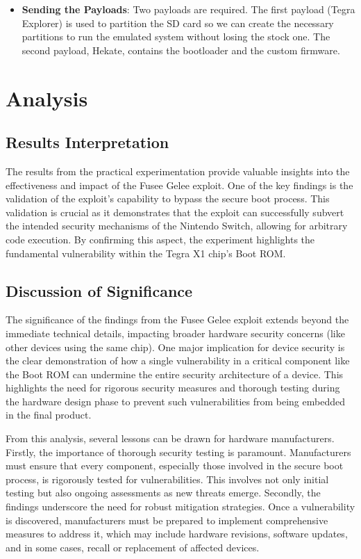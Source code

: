 \begin{itemize}
    \item \textbf{Sending the Payloads}: Two payloads are required. The first payload (Tegra Explorer) is used to partition the SD card so we can create the necessary partitions to run the emulated system without losing the stock one. The second payload, Hekate, contains the bootloader and the custom firmware.
\end{itemize}

\section{Analysis}

\subsection{Results Interpretation}

The results from the practical experimentation provide valuable insights into the effectiveness and impact of the Fusee Gelee exploit. One of the key findings is the validation of the exploit's capability to bypass the secure boot process. This validation is crucial as it demonstrates that the exploit can successfully subvert the intended security mechanisms of the Nintendo Switch, allowing for arbitrary code execution. By confirming this aspect, the experiment highlights the fundamental vulnerability within the Tegra X1 chip's Boot ROM.

\subsection{Discussion of Significance}

The significance of the findings from the Fusee Gelee exploit extends beyond the immediate technical details, impacting broader hardware security concerns (like other devices using the same chip). One major implication for device security is the clear demonstration of how a single vulnerability in a critical component like the Boot ROM can undermine the entire security architecture of a device. This highlights the need for rigorous security measures and thorough testing during the hardware design phase to prevent such vulnerabilities from being embedded in the final product.

From this analysis, several lessons can be drawn for hardware manufacturers. Firstly, the importance of thorough security testing is paramount. Manufacturers must ensure that every component, especially those involved in the secure boot process, is rigorously tested for vulnerabilities. This involves not only initial testing but also ongoing assessments as new threats emerge. Secondly, the findings underscore the need for robust mitigation strategies. Once a vulnerability is discovered, manufacturers must be prepared to implement comprehensive measures to address it, which may include hardware revisions, software updates, and in some cases, recall or replacement of affected devices.

